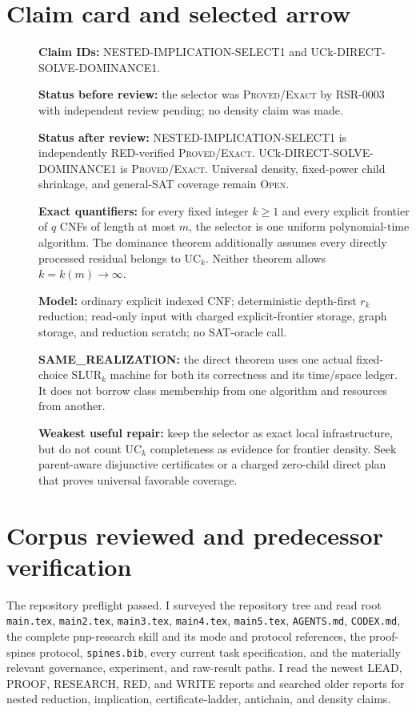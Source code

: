 \documentclass[11pt]{article}
\begin{document}
\section{Claim card and selected arrow}
\begin{description}
\item[] \textbf{Claim IDs:} NESTED-IMPLICATION-SELECT1 and
UCk-DIRECT-SOLVE-DOMINANCE1.
\item[] \textbf{Status before review:} the selector was
\textsc{Proved/Exact} by RSR-0003 with independent review pending; no density
claim was made.
\item[] \textbf{Status after review:} NESTED-IMPLICATION-SELECT1 is
independently RED-verified \textsc{Proved/Exact}.  UCk-DIRECT-SOLVE-
DOMINANCE1 is \textsc{Proved/Exact}.  Universal density, fixed-power child
shrinkage, and general-SAT coverage remain \textsc{Open}.
\item[] \textbf{Exact quantifiers:} for every fixed integer $k\geq1$ and
every explicit frontier of $q$ CNFs of length at most $m$, the selector is
one uniform polynomial-time algorithm.  The dominance theorem additionally
assumes every directly processed residual belongs to $\mathrm{UC}_k$.
Neither theorem allows $k=k(m)\to\infty$.
\item[] \textbf{Model:} ordinary explicit indexed CNF; deterministic
depth-first $r_k$ reduction; read-only input with charged explicit-frontier
storage, graph storage, and reduction scratch; no SAT-oracle call.
\item[] \textbf{SAME\_REALIZATION:} the direct theorem uses one actual
fixed-choice $\mathrm{SLUR}_k$ machine for both its correctness and its
time/space ledger.  It does not borrow class membership from one algorithm
and resources from another.
\item[] \textbf{Weakest useful repair:} keep the selector as exact local
infrastructure, but do not count $\mathrm{UC}_k$ completeness as evidence for
frontier density.  Seek parent-aware disjunctive certificates or a charged
zero-child direct plan that proves universal favorable coverage.
\end{description}

\section{Corpus reviewed and predecessor verification}
The repository preflight passed.  I surveyed the repository tree and read
root \texttt{main.tex}, \texttt{main2.tex}, \texttt{main3.tex},
\texttt{main4.tex}, \texttt{main5.tex}, \texttt{AGENTS.md},
\texttt{CODEX.md}, the complete pnp-research skill and its mode and protocol
references, the proof-spines protocol, \texttt{spines.bib}, every current
task specification, and the materially relevant governance, experiment, and
raw-result paths.  I read the newest LEAD, PROOF, RESEARCH, RED, and WRITE
reports and searched older reports for nested reduction, implication,
certificate-ladder, antichain, and density claims.
\end{document}
